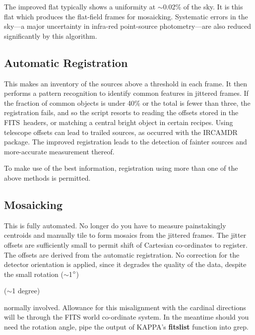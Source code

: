 \documentclass[twoside,11pt]{article}
\newcommand{\htmladdnormallink}[2]{#1}
\newenvironment{latexonly}{}{}
\newcommand{\xref}[3]{#1}
\newcommand{\xlabel}[1]{}
\renewcommand{\_}{\texttt{\symbol{95}}}
\newcommand{\dgs}{\hbox{$^\circ$}}
\newcommand{\dgs}{{\rawhtml &deg;}}
\newcommand{\FITSref}{\htmladdnormallink{FITS}{http://fits.gsfc.nasa.gov/}}
\begin{document}
The improved flat typically shows a uniformity at $\sim$0.02\% of the
sky. It is this flat which produces the flat-field frames for
mosaicking.  Systematic errors in the sky---a major uncertainty in
infra-red point-source photometry---are also reduced significantly by
this algorithm.

\subsection{\xlabel{automatic_registration}Automatic
Registration\label{automatic_registration}}

This makes an inventory of the sources above a threshold in each
frame.  It then performs a \xref{pattern
recognition}{sun139}{mosaicing} to identify common features in
jittered frames.  If the fraction of common objects is under 40\% or
the total is fewer than three, the registration fails, and so the
script resorts to reading the offsets stored in the \FITSref\ headers, or
matching a central bright object in certain recipes.  Using telescope
offsets can lead to trailed sources, as occurred with the
\xref{{\footnotesize IRCAMDR} package}{sun41}{}.  The improved
registration leads to the detection of fainter sources and more-accurate
measurement thereof.

To make use of the best information, registration using more than one
of the above methods is permitted.

\subsection{\xlabel{mosaicking}Mosaicking\label{mosaicking}}

This is fully automated.  No longer do you have to measure
painstakingly centroids and manually tile to form mosaics from the
jittered frames.  The jitter offsets are sufficiently small to permit
shift of Cartesian co-ordinates to register.  The offsets are derived
from the automatic registration.  No correction for the detector
orientation is applied, since it degrades the quality of the data,
despite the small rotation 
\begin{latexonly}
($\sim$1$\dgs$)
\end{latexonly}
\begin{htmlonly}
($\sim$1 degree)
\end{htmlonly}
normally involved.  Allowance for this misalignment with the cardinal
directions will be through the \htmladdnormallink{FITS world co-ordinate
system}{http://fits.gsfc.nasa.gov/documents.html#WCS}. In the meantime
should you need the rotation angle, pipe the output of KAPPA's
\xref{{\bf fitslist}}{sun95}{FITSLIST} function into grep.
\end{document}
